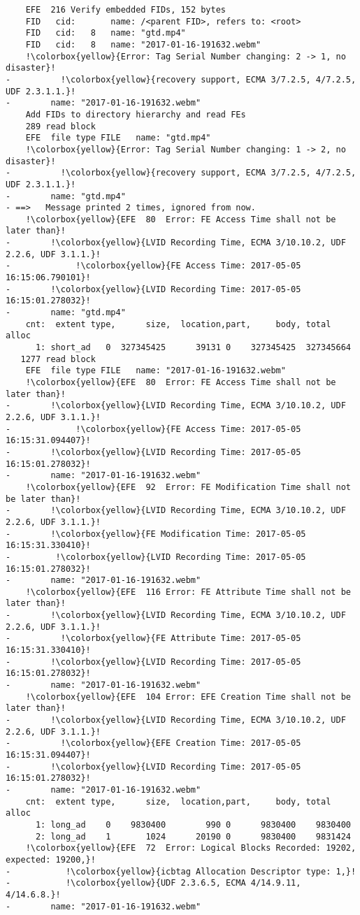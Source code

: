 \begin{lstlisting}
    EFE  216 Verify embedded FIDs, 152 bytes
    FID   cid:       name: /<parent FID>, refers to: <root>
    FID   cid:   8   name: "gtd.mp4"
    FID   cid:   8   name: "2017-01-16-191632.webm"
    !\colorbox{yellow}{Error: Tag Serial Number changing: 2 -> 1, no disaster}!
-          !\colorbox{yellow}{recovery support, ECMA 3/7.2.5, 4/7.2.5, UDF 2.3.1.1.}!
-        name: "2017-01-16-191632.webm"
    Add FIDs to directory hierarchy and read FEs
    289 read block
    EFE  file type FILE   name: "gtd.mp4"
    !\colorbox{yellow}{Error: Tag Serial Number changing: 1 -> 2, no disaster}!
-          !\colorbox{yellow}{recovery support, ECMA 3/7.2.5, 4/7.2.5, UDF 2.3.1.1.}!
-        name: "gtd.mp4"
- ==>   Message printed 2 times, ignored from now.
    !\colorbox{yellow}{EFE  80  Error: FE Access Time shall not be later than}!
-        !\colorbox{yellow}{LVID Recording Time, ECMA 3/10.10.2, UDF 2.2.6, UDF 3.1.1.}!
-             !\colorbox{yellow}{FE Access Time: 2017-05-05 16:15:06.790101}!
-        !\colorbox{yellow}{LVID Recording Time: 2017-05-05 16:15:01.278032}!
-        name: "gtd.mp4"
    cnt:  extent type,      size,  location,part,     body, total alloc
      1: short_ad   0  327345425      39131 0    327345425  327345664
   1277 read block
    EFE  file type FILE   name: "2017-01-16-191632.webm"
    !\colorbox{yellow}{EFE  80  Error: FE Access Time shall not be later than}!
-        !\colorbox{yellow}{LVID Recording Time, ECMA 3/10.10.2, UDF 2.2.6, UDF 3.1.1.}!
-             !\colorbox{yellow}{FE Access Time: 2017-05-05 16:15:31.094407}!
-        !\colorbox{yellow}{LVID Recording Time: 2017-05-05 16:15:01.278032}!
-        name: "2017-01-16-191632.webm"
    !\colorbox{yellow}{EFE  92  Error: FE Modification Time shall not be later than}!
-        !\colorbox{yellow}{LVID Recording Time, ECMA 3/10.10.2, UDF 2.2.6, UDF 3.1.1.}!
-        !\colorbox{yellow}{FE Modification Time: 2017-05-05 16:15:31.330410}!
-         !\colorbox{yellow}{LVID Recording Time: 2017-05-05 16:15:01.278032}!
-        name: "2017-01-16-191632.webm"
    !\colorbox{yellow}{EFE  116 Error: FE Attribute Time shall not be later than}!
-        !\colorbox{yellow}{LVID Recording Time, ECMA 3/10.10.2, UDF 2.2.6, UDF 3.1.1.}!
-          !\colorbox{yellow}{FE Attribute Time: 2017-05-05 16:15:31.330410}!
-        !\colorbox{yellow}{LVID Recording Time: 2017-05-05 16:15:01.278032}!
-        name: "2017-01-16-191632.webm"
    !\colorbox{yellow}{EFE  104 Error: EFE Creation Time shall not be later than}!
-        !\colorbox{yellow}{LVID Recording Time, ECMA 3/10.10.2, UDF 2.2.6, UDF 3.1.1.}!
-          !\colorbox{yellow}{EFE Creation Time: 2017-05-05 16:15:31.094407}!
-        !\colorbox{yellow}{LVID Recording Time: 2017-05-05 16:15:01.278032}!
-        name: "2017-01-16-191632.webm"
    cnt:  extent type,      size,  location,part,     body, total alloc
      1: long_ad    0    9830400        990 0      9830400    9830400
      2: long_ad    1       1024      20190 0      9830400    9831424
    !\colorbox{yellow}{EFE  72  Error: Logical Blocks Recorded: 19202, expected: 19200,}!
-           !\colorbox{yellow}{icbtag Allocation Descriptor type: 1,}!
-           !\colorbox{yellow}{UDF 2.3.6.5, ECMA 4/14.9.11, 4/14.6.8.}!
-        name: "2017-01-16-191632.webm"


\end{lstlisting}

